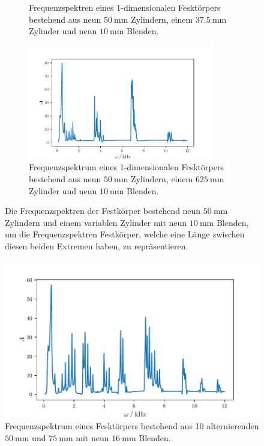 \begin{figure}
\begin{subfigure}{0.48\textwidth}
        \caption{Frequenzspektren eines 1-dimensionalen Fesktörpers bestehend aus neun $\qty{50}{\milli\meter}$ Zylindern, einem 
        $\qty{37.5}{\milli\meter}$ Zylinder und neun $\qty{10}{\milli\meter}$ Blenden.}%
        \label{fig:10c9b625}
    \end{subfigure}%
    \hfill
    \begin{subfigure}{0.48\textwidth}%
        \centering%
        \includegraphics[height=5cm]{build/10c9b75.pdf}%
        \caption{Frequenzspektrum eines 1-dimensionalen Fesktörpers bestehend aus neun $\qty{50}{\milli\meter}$ Zylindern, einem 
        $\qty{625}{\milli\meter}$ Zylinder und neun $\qty{10}{\milli\meter}$ Blenden.}%
        \label{fig:10c9b75}
    \end{subfigure}%
    \caption{Die Frequenzspektren der Festkörper bestehend neun $\qty{50}{\milli\meter}$ Zylindern und einem variablen Zylinder mit neun $\qty{10}{\milli\meter}$ Blenden, um die 
            Frequenzspektren Festkörper, welche eine Länge zwischen diesen beiden Extremen haben, zu repräsentieren.}%
    \label{fig:austauschen}
\end{figure}%
\begin{figure}
    \centering
    \includegraphics{build/5075.pdf}
    \caption{Frequenzspektrum eines Fesktörpers bestehend aus 10 alternierenden $\qty{50}{\milli\meter}$ und $\qty{75}{\milli\meter}$ mit neun 
    $\qty{16}{\milli\meter}$ Blenden.}
    \label{fig:5075}
\end{figure}
